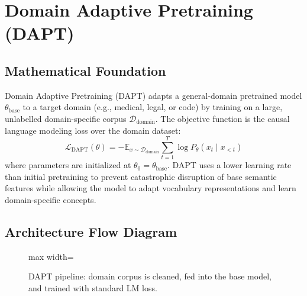 \newpage
\section{Domain Adaptive Pretraining (DAPT)}

\subsection{Mathematical Foundation}
Domain Adaptive Pretraining (DAPT) adapts a general-domain pretrained model $\theta_{\text{base}}$ to a target domain (e.g., medical, legal, or code) by training on a large, unlabelled domain-specific corpus $\mathcal{D}_{\text{domain}}$.
The objective function is the causal language modeling loss over the domain dataset:
\begin{equation}
  \mathcal{L}_{\text{DAPT}}(\theta) = -\mathbb{E}_{x \sim \mathcal{D}_{\text{domain}}} \sum_{t=1}^T \log P_\theta(x_t \mid x_{<t})
\end{equation}
where parameters are initialized at $\theta_0 = \theta_{\text{base}}$. DAPT uses a lower learning rate than initial pretraining to prevent catastrophic disruption of base semantic features while allowing the model to adapt vocabulary representations and learn domain-specific concepts.

\subsection{Architecture Flow Diagram}

\begin{figure}[h]
\centering
\begin{adjustbox}{max width=\linewidth}
\end{adjustbox}
\caption{DAPT pipeline: domain corpus is cleaned, fed into the base model, and trained with standard LM loss.}
\end{figure}

